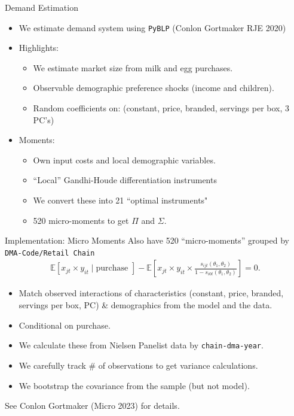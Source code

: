 \documentclass[aspectratio=169,10pt]{beamer}
\begin{document}
\begin{frame}[plain,label=maindemand]{Demand Estimation}
\begin{itemize}
\item We estimate demand system using \texttt{PyBLP} (Conlon Gortmaker RJE 2020)
\item Highlights:
\begin{itemize}
\item We estimate market size from milk and egg purchases.
\item Observable demographic preference shocks (income and children).
\item Random coefficients on: (constant, price, branded, servings per box, 3 PC's)
\end{itemize}
\item Moments:
\begin{itemize}
\item Own input costs and local demographic variables.
\item ``Local'' Gandhi-Houde differentiation instruments
\item We convert these into 21 ``optimal instruments"
\item 520 micro-moments to get $\Pi$ and $\Sigma$.
\end{itemize}
\end{itemize}
\end{frame}


\begin{frame}{Implementation: Micro Moments}
Also have 520 ``micro-moments'' grouped by \texttt{DMA-Code/Retail Chain}
\begin{align*}
\mathbb{E} \left[x_{jt} \times y_{it} \mid \text{purchase } \right] 
- \mathbb{E}\left[x_{jt} \times y_{it}  \times \frac{s_{ijt}(\theta_1,\theta_2)}{1-s_{i0t}(\theta_1,\theta_2)}  \right] = 0.
\end{align*}
\begin{itemize}
\item Match observed interactions of characteristics (constant, price, branded, servings per box, PC) \& demographics from the model and the data.
\item Conditional on purchase.
\item We calculate these from Nielsen Panelist data by \texttt{chain-dma-year}.
\item We carefully track \# of observations to get variance calculations.
\item We bootstrap the covariance from the sample (but not model).
\end{itemize}
See Conlon Gortmaker (Micro 2023) for details.
\end{frame}
\end{document}
